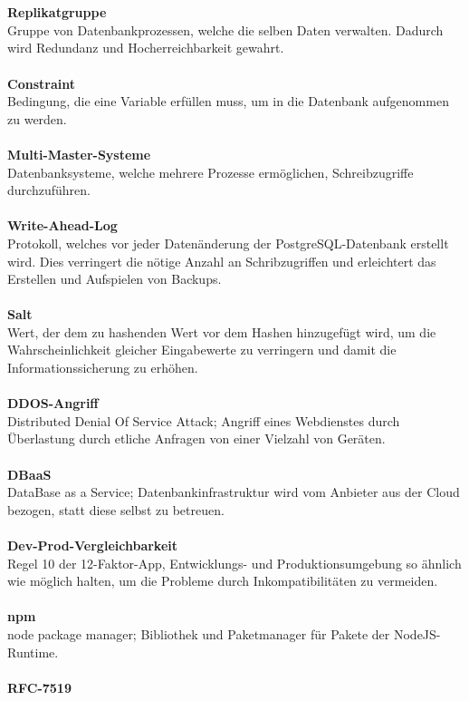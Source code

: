 \\\\
\textbf{Replikatgruppe}\\
Gruppe von Datenbankprozessen, welche die selben Daten verwalten. Dadurch wird Redundanz und Hocherreichbarkeit gewahrt.
\\\\
\textbf{Constraint}\\
Bedingung, die eine Variable erfüllen muss, um in die Datenbank aufgenommen zu werden.
\\\\
\textbf{Multi-Master-Systeme}\\
Datenbanksysteme, welche mehrere Prozesse ermöglichen, Schreibzugriffe durchzuführen.
\\\\
\textbf{Write-Ahead-Log}\\
Protokoll, welches vor jeder Datenänderung der PostgreSQL-Datenbank erstellt wird. Dies verringert die nötige Anzahl an Schribzugriffen und erleichtert das Erstellen und Aufspielen von Backups.
\\\\
\textbf{Salt}\\
Wert, der dem zu hashenden Wert vor dem Hashen hinzugefügt wird, um die Wahrscheinlichkeit gleicher Eingabewerte zu verringern und damit die Informationssicherung zu erhöhen.
\\\\
\textbf{DDOS-Angriff}\\
Distributed Denial Of Service Attack; Angriff eines Webdienstes durch Überlastung durch etliche Anfragen von einer Vielzahl von Geräten.
\\\\
\textbf{DBaaS}\\
DataBase as a Service; Datenbankinfrastruktur wird vom Anbieter aus der Cloud bezogen, statt diese selbst zu betreuen.
\\\\
\textbf{Dev-Prod-Vergleichbarkeit}\\
Regel 10 der 12-Faktor-App, Entwicklungs- und Produktionsumgebung so ähnlich wie möglich halten, um die Probleme durch Inkompatibilitäten zu vermeiden.
\\\\
\textbf{npm}\\
node package manager; Bibliothek und Paketmanager für Pakete der NodeJS-Runtime.
\\\\
\textbf{RFC-7519}\\

